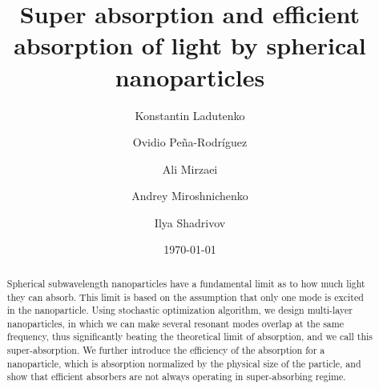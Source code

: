 \documentclass[aps,prl,twocolumn,showpacs,superscriptaddress,groupedaddress]{revtex4-1}
\begin{document}

\title{Super absorption and efficient absorption of light by spherical
  nanoparticles}


\author{Konstantin Ladutenko} 


\author{Ovidio Pe\~{n}a-Rodr\'{i}guez} 


\author{Ali Mirzaei} \author{Andrey Miroshnichenko} \author{Ilya
  Shadrivov} 

\date{\today}

\begin{abstract}
  Spherical subwavelength nanoparticles have a fundamental limit as to
  how much light they can absorb. This limit is based on the
  assumption that only one mode is excited in the nanoparticle. Using
  stochastic optimization algorithm, we design multi-layer nanoparticles, in which we
  can make several resonant modes overlap at the same frequency, thus
  significantly beating the theoretical limit of absorption, and we
  call this super-absorption. We further introduce the efficiency of
  the absorption for a nanoparticle, which is absorption normalized by
  the physical size of the particle, and show that efficient absorbers
  are not always operating in super-absorbing regime.
\end{abstract}
\end{document}
